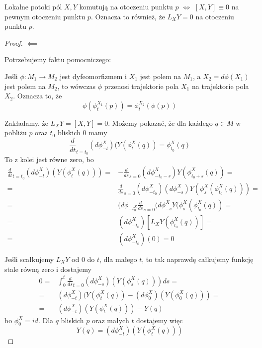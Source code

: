 
\begin{theorem}
  Lokalne potoki pól $X,Y$ komutują na otoczeniu punktu $p$ $\iff$ $[X,Y]\equiv 0$ na pewnym otoczeniu punktu $p$. Oznacza to również, że $L_XY=0$ na otoczeniu punktu $p$.
\end{theorem}

\begin{proof}
  $\impliedby$

  Potrzebujemy faktu pomocniczego:

  Jeśli $\phi:M_1\to M_2$ jest dyfeomorfizmem i $X_1$ jest polem na $M_1$, a $X_2=d\phi(X_1)$ jest polem na $M_2$, to wówczas $\phi$ przenosi trajektorie pola $X_1$ na trajektorie pola $X_2$. Oznacza to, że
  $$\phi(\phi_t^{X_1}(p))=\phi_t^{X_2}(\phi(p))$$

  Zakładamy, że $L_XY=[X,Y]=0$. Możemy pokazać, że dla każdego $q\in M$ w pobliżu $p$ oraz $t_0$ bliskich $0$ mamy
%
  $$\frac{d}{dt}_{t=t_0}(d\phi_{-t}^X)(Y(\phi_t^X(q))=\phi_{t_0}^X(q)$$
  To z kolei jest równe zero, bo
  \begin{align*}
    \frac{d}{dt}_{t=t_0}(d\phi_{-t}^X)(Y(\phi_t^X(q)))=&-\frac{d}{ds}_{s=0}(d\phi_{-t_0-s}^X)Y(\phi_{t_0+s}^X(q))=\\
    =&\frac{d}{ds}_{s=0}(d\phi_{-t_0}^X)(d\phi_{-s}^X)Y(\phi_s^X(\phi_{t_0}^X(q)))=\\
    =&(d\phi_{-t_0^X}\frac{d}{ds}_{s=0}(d\phi_{-s}^XY(\phi_s^X(\phi_{t_0}^X(q))=\\
    =&(d\phi_{-t_0}^X)[L_XY(\phi_{t_0}^X(q))]=\\
    =&(d\phi_{-t_0}^X)(0)=0
  \end{align*}

  Jeśli scałkujemy $L_XY$ od $0$ do $t$, dla małego $t$, to tak naprawdę całkujemy funkcję stale równą zero i dostajemy
  \begin{align*}
    0=&\int_0^{t} \frac{d}{ds}_{t=0}(d\phi_{-s}^X)(Y(\phi_s^X(q)))ds=\\
    =&(d\phi_{-t}^X)(Y(\phi_t^X(q))-(d\phi_0^X)(Y(\phi_0^X(q)))=\\
    =&(d\phi_{-t}^X)(Y(\phi_t^X(q)))-Y(q)
  \end{align*}
  bo $\phi_0^X=id$. Dla $q$ bliskich $p$ oraz małych $t$ dostajemy więc
  $$Y(q)=(d\phi_{-t}^X)(Y(\phi_t^X(q)))$$


\end{proof}
